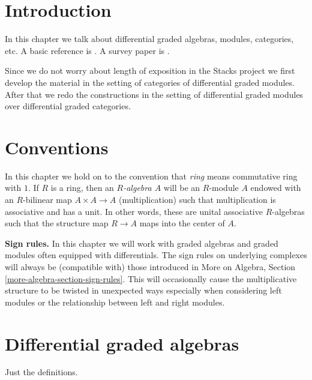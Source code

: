 \section{Introduction}
\label{dga-section-introduction}
In this chapter we talk about differential graded algebras, modules,
categories, etc. A basic reference is \cite{Keller-Deriving}.
A survey paper is \cite{Keller-survey}.

\medskip\noindent
Since we do not worry about length of exposition in the Stacks project
we first develop the material in the setting of categories of differential
graded modules. After that we redo the constructions in the setting of
differential graded modules over differential graded categories.

\section{Conventions}
\label{dga-section-conventions}
In this chapter we hold on to the convention that {\it ring} means
commutative ring with $1$. If $R$ is a ring, then an {\it $R$-algebra $A$}
will be an $R$-module $A$ endowed with an $R$-bilinear map $A \times A \to A$
(multiplication) such that multiplication is associative and has a unit.
In other words, these are unital associative $R$-algebras
such that the structure map $R \to A$ maps into the center of $A$.

\medskip\noindent
{\bf Sign rules.} In this chapter we will work with graded algebras
and graded modules often equipped with differentials. The sign rules on
underlying complexes will always be (compatible with) those introduced in
More on Algebra, Section \ref{more-algebra-section-sign-rules}.
This will occasionally cause the multiplicative structure to be
twisted in unexpected ways especially when considering left modules
or the relationship between left and right modules.

\section{Differential graded algebras}
\label{dga-section-dga}
Just the definitions.


